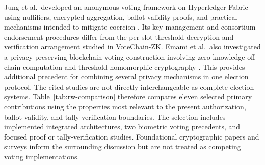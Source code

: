 Jung et al.\ developed an anonymous voting framework on Hyperledger Fabric using nullifiers, encrypted aggregation, ballot-validity proofs, and practical mechanisms intended to mitigate coercion \citep{jung2026anonymous}. Its key-management and consortium endorsement procedures differ from the per-slot threshold decryption and verification arrangement studied in VoteChain-ZK. Emami et al.\ also investigated a privacy-preserving blockchain voting construction involving zero-knowledge off-chain computation and threshold homomorphic cryptography \citep{emami2023scalable}. This provides additional precedent for combining several privacy mechanisms in one election protocol. The cited studies are not directly interchangeable as complete election systems. Table~\ref{tab:rw-comparison} therefore compares eleven selected primary contributions using the properties most relevant to the present authorization, ballot-validity, and tally-verification boundaries. The selection includes implemented integrated architectures, two biometric voting precedents, and focused proof or tally-verification studies. Foundational cryptographic papers and surveys inform the surrounding discussion but are not treated as competing voting implementations.

